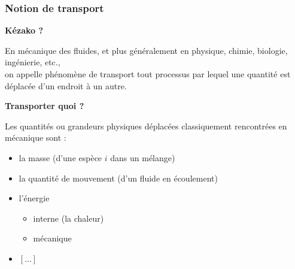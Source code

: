 {%
\subsubsection{Notion de transport}

\begin{frame}{\insertsubsubsectionhead}

\small

\textbf{Kézako ?} \medskip

En mécanique des fluides, et plus généralement en physique, chimie, biologie, ingénierie, etc.,
\\
on appelle \textcolor{rouge}{phénomène de transport} tout processus par lequel une quantité est déplacée d'un endroit à un autre.

\vspace{10mm}

\pause

\textbf{Transporter quoi ? } \medskip

Les \textcolor{rouge}{quantités} ou \textcolor{rouge}{grandeurs physiques} déplacées 
classiquement rencontrées en mécanique sont :

\pause

\smallskip

\begin{itemize}[<+-| alert@+>]
\item
	la \textcolor{vert}{masse} (d'une espèce $i$ dans un mélange)
\item
	la \textcolor{vert}{quantité de mouvement} (d'un fluide en écoulement)
\item
	l'\textcolor{vert}{énergie} 
	\begin{itemize}
	\item interne (la chaleur)
	\item mécanique 
	\end{itemize}
	
\item
  $[\ldots]$
\end{itemize}


\vspace{15mm}

\end{frame}

}
